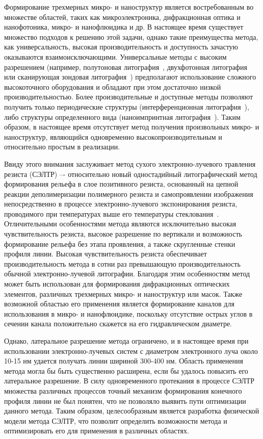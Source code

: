 \actuality

Формирование трехмерных микро- и наноструктур является востребованным во множестве областей, таких как микроэлектроника, дифракционная оптика и нанофотоника, микро- и нанофлюидика и др. В настоящее время существует множество подходов к решению этой задачи, однако такие преимущества метода, как универсальность, высокая производительность и доступность зачастую оказываются взаимоисключающими. Универсальные методы с высоким разрешением (например, полутоновая литография~\cite{GL_general}, двухфотонная литография~\cite{TPL_castle} или сканирующая зондовая литография~\cite{SPL_mechanical}) предполагают использование сложного высокоточного оборудования и обладают при этом достаточно низкой производительностью. Более производительные и доступные методы позволяют получить только периодические структуры (интерференционная литография~\cite{IL_metamaterials}), либо структуры определенного вида (наноимпринтная литография~\cite{NIL_1}). Таким образом, в настоящее время отсутствует метод получения произвольных микро- и наноструктур, являющийся одновременно высокопроизводительным и относительно простым в реализации.

Ввиду этого внимания заслуживает метод сухого электронно-лучевого травления резиста (СЭЛТР) –- относительно новый одностадийный литографический метод формирования рельефа в слое позитивного резиста, основанный на цепной реакции деполимеризации полимерного резиста и самопроявлении изображения непосредственно в процессе электронно-лучевого экспонирования резиста, проводимого при температурах выше его температуры стеклования~\cite{Bruk_2013, Bruk_2016_mee}. Отличительными особенностями метода являются исключительно высокая чувствительность резиста, высокое разрешение по вертикали и возможность формирование рельефа без этапа проявления, а также скругленные стенки профиля линии. Высокая чувствительность резиста обеспечивает производительность метода в сотни раз превышающую производительность обычной электронно-лучевой литографии. Благодаря этим особенностям метод может быть использован для формирования дифракционных оптических элементов, различных трехмерных микро- и наноструктур или масок. Также возможной областью его применения является формирование каналов для использования в микро- и нанофлюидике, поскольку отсутствие острых углов в сечении канала положительно скажется на его гидравлическом диаметре.

Однако, латеральное разрешение метода ограничено, и в настоящее время при использовании электронно-лучевых систем с диаметром электронного луча около 10-15 нм удается получать линии шириной 300-400 нм. Область применения метода могла бы быть существенно расширена, если бы удалось повысить его латеральное разрешение. В силу одновременного протекания в процессе СЭЛТР множества различных процессов точный механизм формирования конечного профиля линии не был понятен, что не позволяло выявить пути оптимизации данного метода. Таким образом, целесообразным является разработка физической модели метода СЭЛТР, что позволит определить возможности метода и оптимизировать его для применения в различных областях.


